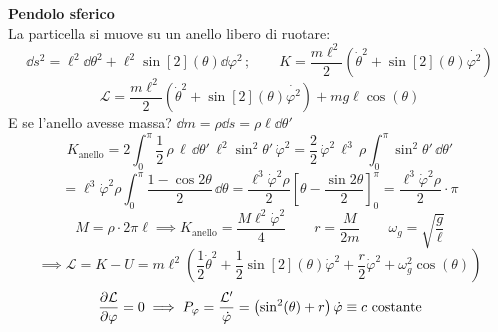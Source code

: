 \begin{example}
    \textbf{Pendolo sferico}\\
    La particella si muove su un anello libero di ruotare:
    \begin{equation}
        \dd{s^2}=\ell^2\dd{\theta^2}+\ell^2\sin[2](\theta)\dd{\varphi^2}\,;\qquad 
        K = \frac{m\ell^2}{2}\left( \dot{\theta}^2+\sin[2](\theta)\dot{\varphi^2} \right)
    \end{equation}
    \begin{equation}
        \mathcal{L}= \frac{m\ell^2}{2}\left( \dot{\theta}^2+\sin[2](\theta)\dot{\varphi^2} \right)+mg\ell\cos(\theta)
    \end{equation}
    E se l'anello avesse massa? $\dd{m}= \rho\dd{s}=\rho\ell\dd{\theta'}$
    \begin{equation*}
        K_{\text{anello}} = 2 \int_0^{\pi} \frac{1}{2} \, \rho \, \ell \, \dd{\theta'} \, \ell^2 \sin^2\theta' \, \dot{\varphi}^2
        = \frac{2}{2} \, \dot{\varphi}^2 \, \ell^3 \, \rho \int_0^{\pi} \sin^2\theta' \, \dd{\theta'}
    \end{equation*}
    \begin{equation}
        = \ell^3 \dot{\varphi}^2 \rho \int_0^{\pi} \frac{1 - \cos 2\theta}{2} \, \dd{\theta}
        = \frac{\ell^3 \dot{\varphi}^2 \rho}{2} \left[ \theta - \frac{\sin 2\theta}{2} \right]_0^{\pi}
        = \frac{\ell^3 \dot{\varphi}^2 \rho}{2} \cdot \pi
    \end{equation}
    \begin{equation}
        M = \rho \cdot 2\pi\ell \implies K_\text{anello}= \frac{M \ell^2 \dot{\varphi}^2}{4}\qquad
        r = \frac{M}{2m} \qquad \omega_g = \sqrt{\frac{g}{\ell}}
    \end{equation}
    \begin{equation}
        \implies \mathcal{L}= K-U = m\ell^2\left( \frac{1}{2}\dot{\theta}^2 +\frac{1}{2}\sin[2](\theta)\dot{\varphi}^2+ \frac{r}{2}\dot{\varphi}^2+ \omega^2_g\cos(\theta)\right)
    \end{equation}
    \begin{equation}
        \pdv{\mathcal{L}}{\varphi}=0\implies P_\varphi= \frac{\mathcal{L}'}{\dot{\varphi}}= \left( \sin[2](\theta)+r \right)\dot{\varphi}\equiv c \text{ costante}
    \end{equation}


\end{example}
